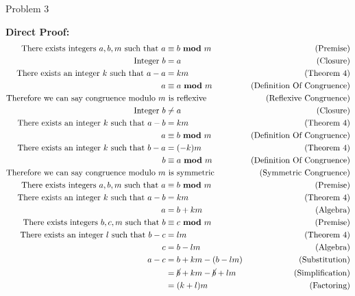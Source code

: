 \begin{problem}{Problem 3}
\begin{highlight}[Solution]
        \noindent \textbf{Direct Proof:}
        \begin{align*}
            \text{There exists integers } a, b, m \text{ such that } a & \equiv b \modulo m & \text{(Premise)} \\
            \text{Integer } b & = a & \text{(Closure)} \\
            \text{There exists an integer } k \text{ such that } a - a & = km & \text{(Theorem 4)} \\
            a & \equiv a \modulo m & \text{(Definition Of Congruence)} \\
            \text{Therefore we can say congruence modulo } m & \text{ is reflexive} & \text{(Reflexive Congruence)} \\
            \text{Integer } b & \neq a & \text{(Closure)} \\
            \text{There exists an integer } k \text{ such that } a - b & = km & \text{(Theorem 4)} \\
            a & \equiv b \modulo m & \text{(Definition Of Congruence)} \\
            \text{There exists an integer } k \text{ such that } b - a & = (-k)m & \text{(Theorem 4)} \\
            b & \equiv a \modulo m & \text{(Definition Of Congruence)} \\
            \text{Therefore we can say congruence modulo } m & \text{ is symmetric} & \text{(Symmetric Congruence)} \\
            \text{There exists integers } a, b, m \text{ such that } a & \equiv b \modulo m & \text{(Premise)} \\
            \text{There exists an integer } k \text{ such that } a - b & = km & \text{(Theorem 4)} \\
            a & = b + km & \text{(Algebra)} \\
            \text{There exists integers } b, c, m \text{ such that } b & \equiv c \modulo m & \text{(Premise)} \\
            \text{There exists an integer } l \text{ such that } b - c & = lm & \text{(Theorem 4)} \\
            c & = b - lm & \text{(Algebra)} \\
            a - c & = b + km - (b - lm) & \text{(Substitution)} \\
            & = \cancel{b} + km - \cancel{b} + lm & \text{(Simplification)} \\
            & = (k + l)m & \text{(Factoring)} \\

\end{align*}
\end{highlight}
\end{problem}
